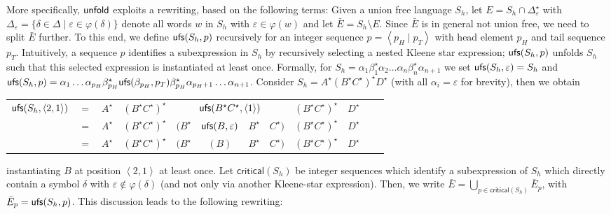 \documentclass[envcountsame]{llncs}
\newcommand{\unfold}{\ensuremath{{\sf unfold}}\xspace}
\newcommand{\unfoldstep}{\ensuremath{{\sf ufs}}\xspace}
\newcommand{\criticalpos}{\ensuremath{\mathsf{critical}}\xspace}
\begin{document}
More specifically, \unfold exploits a rewriting, based on the
following terms:
Given a union free language $S_h$, let
$E=S_h\cap\Delta_\varepsilon^\star$ with $\Delta_\varepsilon =
\{\delta\in\Delta \mid \varepsilon\in\varphi(\delta)\}$ denote all
words $w$ in $S_h$ with $\varepsilon\in\varphi(w)$ and let $\bar
E=S_h\setminus E$.
Since $\bar E$ is in general not union free, we need to split $\bar E$
further. 
To this end, we define $\unfoldstep(S_h,p)$ recursively for an integer
sequence $p=\left<p_H \mid p_T\right>$ with head element $p_H$ and
tail sequence $p_T$.
Intuitively, a sequence $p$ identifies a subexpression in $S_h$ by
recursively selecting a nested Kleene star expression;
$\unfoldstep(S_h,p)$ unfolds $S_h$ such that this selected expression
is instantiated at least once. 
Formally, for $S_h=\alpha_1\beta_1^\star\alpha_2 \dots
\alpha_n\beta_n^\star\alpha_{n+1}$ we set
$\unfoldstep(S_h,\varepsilon)=S_h$ and $\unfoldstep(S_h, p) =
\alpha_1\dots \alpha_{p_H} \beta_{p_H}^\star
\unfoldstep(\beta_{p_H},p_T) \beta_{p_H}^\star
\alpha_{p_H+1}\dots\alpha_{n+1}$.
Consider $S_h=A^\star(B^\star C^\star)^\star D^\star$ (with
all $\alpha_i=\varepsilon$ for brevity), then we obtain 
\vspace*{-.5em}\begin{center}\begin{tabular}{cccccccccccc}
    $\unfoldstep(S_h,\left<2,1\right>)$ & $=$ & $A^\star$ & $(B^\star
    C^\star)^\star$ & \multicolumn{4}{c}{$\unfoldstep(B^\star
      C^\star,\left<1\right>)$} &
    $(B^\star C^\star)^\star$ & $D^\star$ \\
    & $=$ & $A^\star$ & $(B^\star C^\star)^\star$ & $(B^\star$ &
    $\unfoldstep(B,\varepsilon)$ & $B^\star$ & $C^\star)$ & $(B^\star
    C^\star)^\star$ & $D^\star$ \\
    & $=$ & $A^\star$ & $(B^\star C^\star)^\star$ & $(B^\star$ & $(B)$
    & $B^\star$ & $C^\star)$ & $(B^\star C^\star)^\star$ & $D^\star$
\end{tabular}\end{center}\vspace*{-.5em}
instantiating $B$ at position $\left<2,1\right>$ at least once. 
Let $\criticalpos(S_h)$ be integer sequences which identify a
subexpression of $S_h$ which directly contain a symbol $\delta$ with
$\varepsilon\not\in\varphi(\delta)$ (and not only via another
Kleene-star expression).
Then, we write $\bar E= \bigcup_{p\in \criticalpos(S_h)} \bar E_p$,
with $\bar E_p=\unfoldstep(S_h,p)$.
This discussion leads to the following rewriting:
\end{document}
